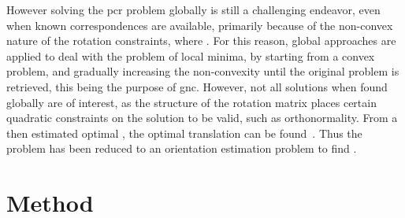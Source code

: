 However solving the \gls{pcr} problem globally is still a challenging endeavor, even when known correspondences are available, primarily because of the non-convex nature of the rotation constraints, where . For this reason, global approaches are applied to deal with the problem of local minima, by starting from a convex problem, and gradually increasing the non-convexity until the original problem is retrieved, this being the purpose of \gls{gnc}. However, not all solutions when found globally are of interest, as the structure of the rotation matrix places certain quadratic constraints on the solution to be valid, such as orthonormality. From a then estimated optimal , the optimal translation  can be found~\cite{convex-global-3d-registration-with-lagrangian-duality}. Thus the problem has been reduced to an orientation estimation problem to find \tf[R]{\star}{}.

\section{Method}\label{sec:2-pose-estimation-method}






